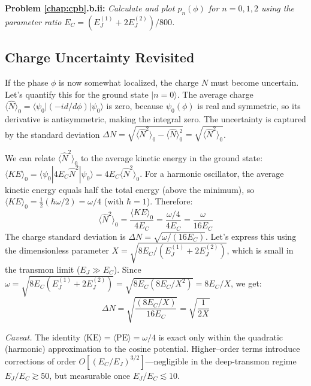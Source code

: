 \documentclass{book}
\newenvironment{problem}[1][Problem]{\par\medskip\noindent\textbf{#1:}\em}{\par\medskip}
\begin{document}
\begin{problem}[Problem \ref{chap:cpb}.b.ii] 
Calculate and plot \(p_n(\phi)\) for \(n=0, 1, 2\) using the parameter ratio \(E_C = (E_J^{(1)} + 2 E_J^{(2)}) / 800\).
\end{problem}

\subsection{Charge Uncertainty Revisited}
\label{subsec:charge_uncertainty}

If the phase \(\phi\) is now somewhat localized, the charge \(N\) must become uncertain. Let's quantify this for the ground state \(|n=0\rangle\). The average charge \(\langle \hat{N} \rangle_0 = \langle \psi_0 | (-i d/d\phi) | \psi_0 \rangle\) is zero, because \(\psi_0(\phi)\) is real and symmetric, so its derivative is antisymmetric, making the integral zero. The uncertainty is captured by the standard deviation \(\Delta N = \sqrt{\langle \hat{N}^2 \rangle_0 - \langle \hat{N} \rangle_0^2} = \sqrt{\langle \hat{N}^2 \rangle_0}\).

We can relate \(\langle \hat{N}^2 \rangle_0\) to the average kinetic energy in the ground state: \(\langle KE \rangle_0 = \langle \psi_0 | 4 E_C \hat{N}^2 | \psi_0 \rangle = 4 E_C \langle \hat{N}^2 \rangle_0\). For a harmonic oscillator, the average kinetic energy equals half the total energy (above the minimum), so \(\langle KE \rangle_0 = \frac{1}{2} (\hbar \omega / 2) = \omega/4\) (with \(\hbar=1\)). Therefore:
\[ \langle \hat{N}^2 \rangle_0 = \frac{\langle KE \rangle_0}{4 E_C} = \frac{\omega / 4}{4 E_C} = \frac{\omega}{16 E_C} \]
The charge standard deviation is \(\Delta N = \sqrt{\omega / (16 E_C)}\). Let's express this using the dimensionless parameter \(X = \sqrt{8 E_C / (E_J^{(1)} + 2 E_J^{(2)})}\), which is small in the transmon limit (\(E_J \gg E_C\)). Since \(\omega = \sqrt{8 E_C (E_J^{(1)} + 2 E_J^{(2)})} = \sqrt{8 E_C (8E_C/X^2)} = 8E_C/X\), we get:
\begin{equation}
\Delta N = \sqrt{\frac{(8 E_C / X)}{16 E_C}} = \sqrt{\frac{1}{2X}}
\end{equation}

\medskip
\noindent\textit{Caveat.}
The identity $\langle\mathrm{KE}\rangle=\langle\mathrm{PE}\rangle=\omega/4$
is exact only within the quadratic (harmonic) approximation to the cosine
potential.  Higher–order terms introduce corrections of order
$O[(E_C/E_J)^{3/2}]$—negligible in the deep-transmon regime
$E_J/E_C\!\gtrsim\!50$, but measurable once $E_J/E_C\lesssim10$.
\end{document}
